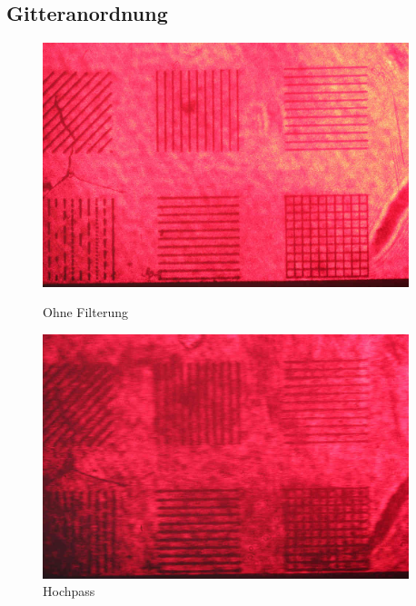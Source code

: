         \subsection*{Gitteranordnung}
            \begin{figure}[H]
                  \begin{minipage}{0.33\textwidth}
                   \centering
                    \includegraphics[width=0.95\textwidth]{Abb/Abb_17.JPG}
                    \caption{Ohne Filterung}
                  \end{minipage}\hfill
                  \begin{minipage}{0.33\textwidth}
                   \centering
                    \includegraphics[width=0.95\textwidth]{Abb/Abb_18.JPG}
                    \caption{Hochpass}
                  \end{minipage}\hfill
                  \begin{minipage}{0.33\textwidth}
                     \centering

\end{minipage}
\end{figure}
